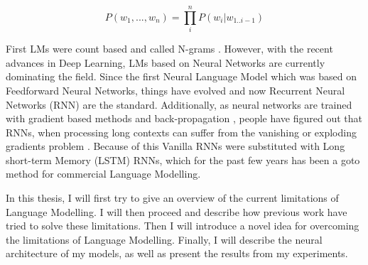\begin{displaymath}
    P(w_1, ..., w_n) = \prod_i^n P(w_i | w_{1..i-1})
\end{displaymath}

First LMs were count based and called N-grams \cite{martin2009speech}. However, with the recent advances in Deep Learning, LMs based on Neural Networks are currently dominating the field. Since the first Neural Language Model \cite{bengio2003neural} which was based on Feedforward Neural Networks, things have evolved and now Recurrent Neural Networks (RNN) \cite{mikolov2010recurrent} are the standard. Additionally, as neural networks are trained with gradient based methods and back-propagation \cite{rumelhart1988learning}, people have figured out that RNNs, when processing long contexts can suffer from the vanishing or exploding gradients problem \cite{hochreiter1998vanishing}\cite{pascanu2012understanding}\cite{pascanu2013difficulty}. Because of this Vanilla RNNs were substituted with Long short-term Memory (LSTM) \cite{hochreiter1997long} RNNs, which for the past few years has been a goto method for commercial Language Modelling.

In this thesis, I will first try to give an overview of the current limitations of Language Modelling. I will then proceed and describe how previous work have tried to solve these limitations. Then I will introduce a novel idea for overcoming the limitations of Language Modelling. Finally, I will describe the neural architecture of my models, as well as present the results from my experiments.
